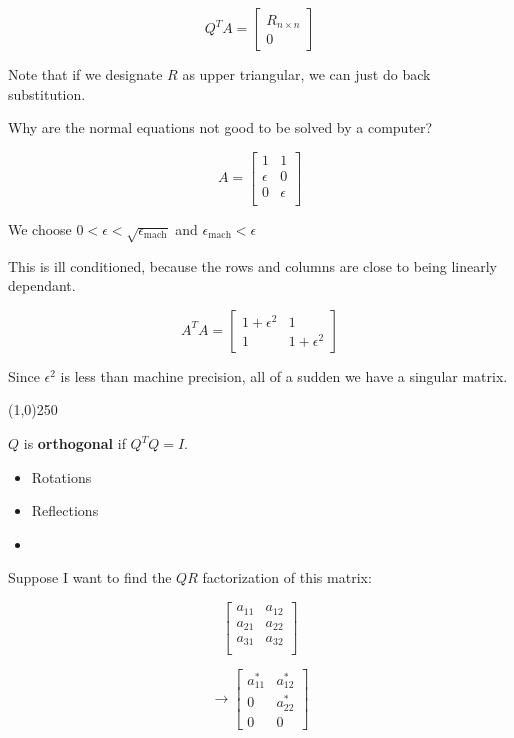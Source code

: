 \[
  Q^TA = 
  \begin{bmatrix}
    R_{n \times n} \\ 0
  \end{bmatrix}
\]

Note that if we designate $R$ as upper triangular, we can just do back substitution. 

Why are the normal equations not good to be solved by a computer?

\[
  A =
  \begin{bmatrix}
    1 & 1 \\
    \epsilon & 0 \\
    0 & \epsilon \\
  \end{bmatrix}
\]

We choose $0 < \epsilon < \sqrt{\epsilon_\text{mach}}$ and $\epsilon_\text{mach} < \epsilon$

This is ill conditioned, because the rows and columns are close to being linearly dependant.

\[
  A^T A = \begin{bmatrix}
    1 + \epsilon^2 & 1 \\
    1 & 1 + \epsilon^2
  \end{bmatrix}
\]

Since $\epsilon^2$ is less than machine precision, all of a sudden we have a singular matrix.

\begin{center}
\line(1,0){250}
\end{center}

$Q$ is \textbf{orthogonal} if $Q^TQ = I$.

\begin{itemize}
  \item Rotations
  \item Reflections
  \item
\end{itemize}

Suppose I want to find the $QR$ factorization of this matrix:

\[
  \begin{bmatrix}
    a_{11} & a_{12} \\
    a_{21} & a_{22} \\
    a_{31} & a_{32} \\
  \end{bmatrix}
\]

\[
  \rightarrow \begin{bmatrix}
     a_{11}^* & a_{12}^* \\
    0 & a_{22}^* \\
    0 & 0
  \end{bmatrix}
\]

